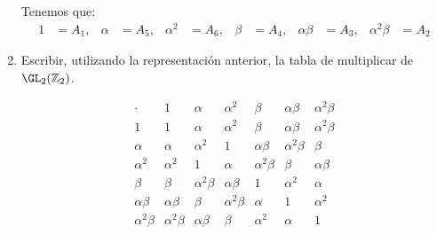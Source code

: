 \begin{ejercicio}
\begin{enumerate}
        Tenemos que:
        \begin{align*}
            1&= A_1, & \alpha &= A_5, & \alpha^2 &= A_6,& \beta &= A_4, & \alpha\beta &= A_3, & \alpha^2\beta &= A_2
        \end{align*}
        \item Escribir, utilizando la representación anterior, la tabla de multiplicar de $\GL_2(\mathbb{Z}_2)$.
        
        \begin{equation*}
            \begin{array}{c|cccccc}
                \cdot & 1 & \alpha & \alpha^2 & \beta & \alpha\beta & \alpha^2\beta \\ \hline
                1 & 1 & \alpha & \alpha^2 & \beta & \alpha\beta & \alpha^2\beta \\
                \alpha & \alpha & \alpha^2 & 1 & \alpha\beta & \alpha^2\beta & \beta \\
                \alpha^2 & \alpha^2 & 1 & \alpha & \alpha^2\beta & \beta & \alpha\beta \\
                \beta & \beta & \alpha^2\beta & \alpha\beta & 1 & \alpha^2 & \alpha \\
                \alpha\beta & \alpha\beta & \beta & \alpha^2\beta & \alpha & 1 & \alpha^2 \\
                \alpha^2\beta & \alpha^2\beta & \alpha\beta & \beta & \alpha^2 & \alpha & 1
            \end{array}
        \end{equation*}
    \end{enumerate}
\end{ejercicio}

